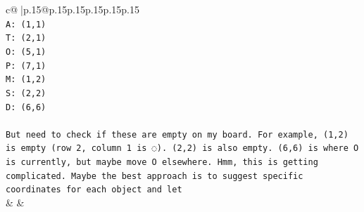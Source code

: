 \documentclass{article}
\begin{document}
{\begin{supertabular}{c@{$\;$}|p{.15\linewidth}@{}p{.15\linewidth}p{.15\linewidth}p{.15\linewidth}p{.15\linewidth}p{.15\linewidth}}
{{{\\ 
\texttt{A: (1,1)} \\
\texttt{T: (2,1)} \\
\texttt{O: (5,1)} \\
\texttt{P: (7,1)} \\
\texttt{M: (1,2)} \\
\texttt{S: (2,2)} \\
\texttt{D: (6,6)} \\
\\ 
\texttt{But need to check if these are empty on my board. For example, (1,2) is empty (row 2, column 1 is ◌). (2,2) is also empty. (6,6) is where O is currently, but maybe move O elsewhere. Hmm, this is getting complicated. Maybe the best approach is to suggest specific coordinates for each object and let} \\
            }
        }
    }
    & & \\ \\


\end{supertabular}}
\end{document}
